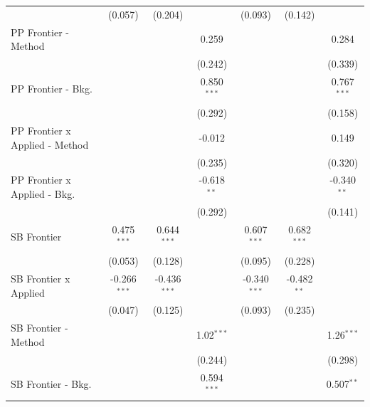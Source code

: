 \begin{tabular}{lcccccc}
                                  & (0.057)        & (0.204)        &                & (0.093)        & (0.142)        &   \\   
   PP Frontier - Method           &                &                & 0.259          &                &                & 0.284\\   
                                  &                &                & (0.242)        &                &                & (0.339)\\   
   PP Frontier - Bkg.             &                &                & 0.850$^{***}$  &                &                & 0.767$^{***}$\\   
                                  &                &                & (0.292)        &                &                & (0.158)\\   
   PP Frontier x Applied - Method &                &                & -0.012         &                &                & 0.149\\   
                                  &                &                & (0.235)        &                &                & (0.320)\\   
   PP Frontier x Applied - Bkg.   &                &                & -0.618$^{**}$  &                &                & -0.340$^{**}$\\   
                                  &                &                & (0.292)        &                &                & (0.141)\\   
   SB Frontier                    & 0.475$^{***}$  & 0.644$^{***}$  &                & 0.607$^{***}$  & 0.682$^{***}$  &   \\   
                                  & (0.053)        & (0.128)        &                & (0.095)        & (0.228)        &   \\   
   SB Frontier x Applied          & -0.266$^{***}$ & -0.436$^{***}$ &                & -0.340$^{***}$ & -0.482$^{**}$  &   \\   
                                  & (0.047)        & (0.125)        &                & (0.093)        & (0.235)        &   \\   
   SB Frontier - Method           &                &                & 1.02$^{***}$   &                &                & 1.26$^{***}$\\   
                                  &                &                & (0.244)        &                &                & (0.298)\\   
   SB Frontier - Bkg.             &                &                & 0.594$^{***}$  &                &                & 0.507$^{**}$\\   

\end{tabular}
